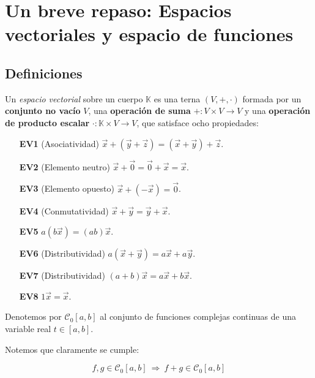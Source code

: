 \chapter{Un breve repaso: Espacios vectoriales y espacio de funciones}

\section{Definiciones}

\begin{defi}
    Un \emph{espacio vectorial} sobre un cuerpo $\mathbb{K}$ es una terna $(V, +, \cdot)$ formada por un \textbf{conjunto no vacío} $V$, una \textbf{operación de suma} $+: V \times V \to V$ y una \textbf{operación de producto escalar} $\cdot: \mathbb{K} \times V \to V$, que satisface ocho propiedades: 

    \begin{multicols}{2}   
        \begin{itemize}
            \item[\textbf{EV1}] (Asociatividad) $\vec{x} + (\vec{y} + \vec{z}) = (\vec{x} + \vec{y}) + \vec{z}$. 
            \item[\textbf{EV2}] (Elemento neutro) $\vec{x} + \vec{0} = \vec{0} + \vec{x} = \vec{x}$.
            \item[\textbf{EV3}] (Elemento opuesto) $\vec{x} + (-\vec{x}) = \vec{0}$.
            \item[\textbf{EV4}] (Conmutatividad) $\vec{x} + \vec{y} = \vec{y} + \vec{x}$. 
            \item[\textbf{EV5}] $a(b\vec{x}) = (ab) \vec{x}$.
            \item[\textbf{EV6}] (Distributividad) $a(\vec{x} + \vec{y}) = a \vec{x} + a\vec{y}$.
            \item[\textbf{EV7}] (Distributividad) $(a+b) \vec{x} = a\vec{x} + b\vec{x}$.
            \item[\textbf{EV8}] $1\vec{x} = \vec{x}$.    
        \end{itemize}
    \end{multicols}
\end{defi}

Denotemos por $\mathscr{C}_0 [a,b]$ al conjunto de funciones complejas continuas de una variable real $t \in [a,b]$.

Notemos que claramente se cumple:
\begin{shaded}
$$f,g \in \mathscr{C}_0[a,b] ~\Rightarrow~ f + g \in \mathscr{C}_0 [a,b]$$
\end{shaded}

